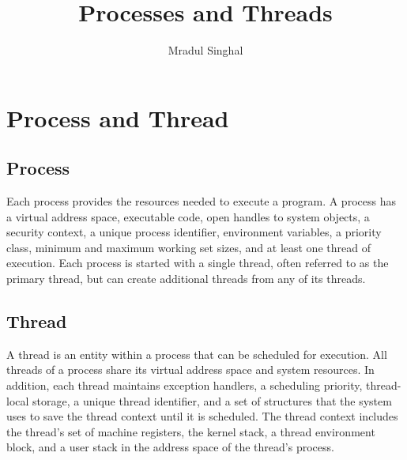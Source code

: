 \documentclass{article}
\title{Processes and Threads}
\author{Mradul Singhal}
\begin{document}
\maketitle
\newpage

\tableofcontents
\newpage

\section{Process and Thread}
\subsection{Process}
Each process provides the resources needed to execute a program. A process has a virtual address space, executable code, open handles to system objects, a security context, a unique process identifier, environment variables, a priority class, minimum and maximum working set sizes, and at least one thread of execution. Each process is started with a single thread, often referred to as the primary thread, but can create additional threads from any of its threads.

\subsection{Thread}
A thread is an entity within a process that can be scheduled for execution. All threads of a process share its virtual address space and system resources. In addition, each thread maintains exception handlers, a scheduling priority, thread-local storage, a unique thread identifier, and a set of structures that the system uses to save the thread context until it is scheduled. The thread context includes the thread's set of machine registers, the kernel stack, a thread environment block, and a user stack in the address space of the thread's process.
\end{document}
